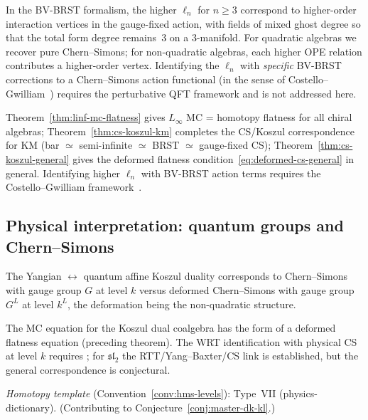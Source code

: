 \begin{remark}
\label{rem:cs-koszul-heuristic}
In the BV-BRST formalism, the higher $\ell_n$ for $n \geq 3$
correspond to higher-order interaction vertices in the
gauge-fixed action, with fields of mixed ghost degree so that
the total form degree remains~$3$ on a $3$-manifold.
For quadratic algebras we recover pure Chern--Simons; for
non-quadratic algebras, each higher OPE relation contributes
a higher-order vertex.  Identifying the $\ell_n$ with
\emph{specific} BV-BRST corrections to a Chern--Simons
action functional (in the sense of Costello--Gwilliam~\cite{CG17})
requires the perturbative QFT framework and is not addressed here.
\end{remark}

\begin{remark}[Scope]
Theorem~\ref{thm:linf-mc-flatness} gives $L_\infty$ MC = homotopy flatness for all chiral algebras; Theorem~\ref{thm:cs-koszul-km} completes the CS/Koszul correspondence for KM (bar $\simeq$ semi-infinite $\simeq$ BRST $\simeq$ gauge-fixed CS); Theorem~\ref{thm:cs-koszul-general} gives the deformed flatness condition~\eqref{eq:deformed-cs-general} in general.  Identifying higher $\ell_n$ with BV-BRST action terms requires the Costello--Gwilliam framework~\cite{CG17}.
\end{remark}

\subsection{Physical interpretation: quantum groups and Chern--Simons}

\begin{conjecture}\label{conj:wrt-conjecture}
The Yangian $\leftrightarrow$ quantum affine Koszul duality corresponds to Chern--Simons with gauge group $G$ at level $k$ versus deformed Chern--Simons with gauge group $G^L$ at level $k^L$, the deformation being the non-quadratic structure.
\end{conjecture}

\begin{remark}[Scope]
The MC equation for the Koszul dual coalgebra has the form of a deformed flatness equation (preceding theorem).  The WRT identification with physical CS at level $k$ requires \cite{Wit89,RT91}; for $\mathfrak{sl}_2$ the RTT/Yang--Baxter/CS link is established, but the general correspondence is conjectural.

\emph{Homotopy template} (Convention~\ref{conv:hms-levels}): Type~VII (physics-dictionary).  (Contributing to Conjecture~\ref{conj:master-dk-kl}.)
\end{remark}

